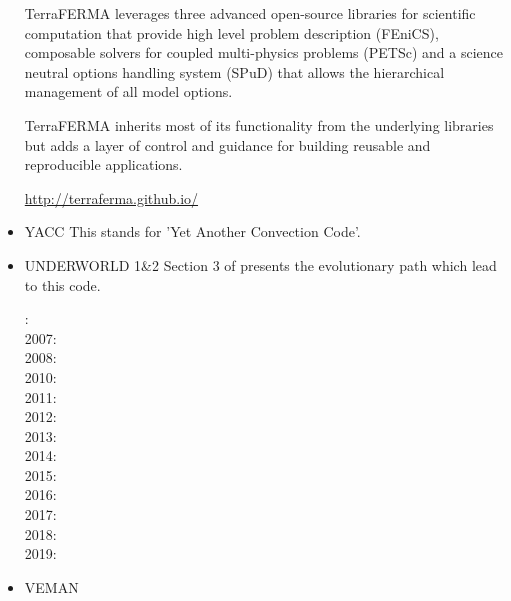 \begin{itemize}
TerraFERMA leverages three advanced open-source libraries for scientific computation that provide high level problem description (FEniCS), composable solvers for coupled multi-physics problems (PETSc) and a science neutral options handling system (SPuD) that allows the hierarchical management of all model options.

TerraFERMA inherits most of its functionality from the underlying libraries but adds a layer of control and guidance for building reusable and reproducible applications.

\url{http://terraferma.github.io/}

{\small
\noindent
\cite{wisv14}
\cite{wisv17}
\cite{spmw16}
\cite{ceww17}
\cite{ceww19}
}

\item {\codefont YACC} 
This stands for 'Yet Another Convection Code'.

{\small
\noindent
\cite{sato12}
\cite{toyd13}
\cite{tosn15}
\cite{tomy16}
}

\item {\codefont UNDERWORLD 1\&2} 
Section 3 of \cite{qums07} presents the evolutionary path which lead to this code.

{\small
{}: \cite{stfs06}\cite{momu06}\\
2007: \cite{moql07}\cite{stfs07}\cite{qums07}\\
2008: \cite{lemm08}\cite{ozrs08}\cite{gotc08}\cite{stmt08}\cite{scsf11}\\
2010: \cite{casm10}\cite{mamb10}\cite{stsf10}\cite{stfc10}\cite{fasm10}\cite{cazf10}\\
2011: \cite{memm11}\cite{cafz11}\\
2012: \cite{cafa12}\\
2013: \cite{bemm12}\cite{scmo13}\cite{faca13}\cite{care13}\cite{coml13}\\
2014: \cite{famc14}\cite{shjm14}\\
2015: \cite{quxm15}\cite{bemm15}\cite{scsp15}\cite{shmj15}\\
2016: \cite{shmv16}\cite{onlw16}\cite{kicf16}\\
2017: \cite{bems17}\cite{kicf17}\cite{sche17}\cite{wakc17}\\
2018: \cite{memm18}\cite{yamz18}\cite{bemc18}\cite{mord18}\\
2019: \cite{samo19}\cite{yamg19}\cite{canc19}\cite{cakc19}\cite{sams19b}\cite{bore19}
}

\item {\codefont VEMAN}

{\small
\noindent
\cite{bepo10}
}

\end{itemize}
